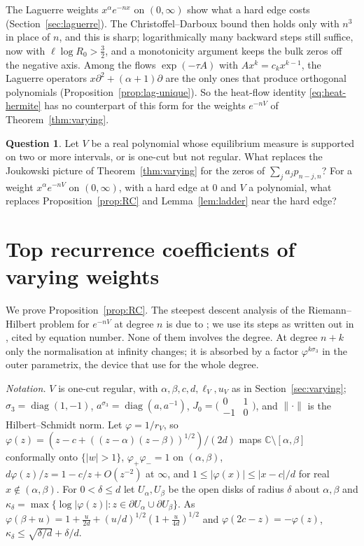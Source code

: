 \documentclass[11pt]{amsart}
\theoremstyle{definition}
\newtheorem{question}[theorem]{Question}
\theoremstyle{remark}
\numberwithin{equation}{section}
\newcommand{\C}{\mathbb{C}}
\begin{document}
The Laguerre weights $x^\alpha e^{-nx}$ on $(0,\infty)$ show what a hard edge costs (Section~\ref{sec:laguerre}). The Christoffel--Darboux bound then holds only with $n^3$ in place of $n$, and this is sharp; logarithmically many backward steps still suffice, now with $\ell\log R_0>\frac32$, and a monotonicity argument keeps the bulk zeros off the negative axis. Among the flows $\exp(-\tau A)$ with $Ax^k=c_kx^{k-1}$, the Laguerre operators $x\partial^2+(\alpha+1)\partial$ are the only ones that produce orthogonal polynomials (Proposition~\ref{prop:lag-unique}). So the heat-flow identity \eqref{eq:heat-hermite} has no counterpart of this form for the weights $e^{-nV}$ of Theorem~\ref{thm:varying}.

\begin{question}\label{q:varying}
Let $V$ be a real polynomial whose equilibrium measure is supported on two or more intervals, or is one-cut but not regular. What replaces the Joukowski picture of Theorem~\ref{thm:varying} for the zeros of $\sum_ja_jp_{n-j,n}$? For a weight $x^\alpha e^{-nV}$ on $(0,\infty)$, with a hard edge at $0$ and $V$ a polynomial, what replaces Proposition~\ref{prop:RC} and Lemma~\ref{lem:ladder} near the hard edge?
\end{question}

\appendix

\section{Top recurrence coefficients of varying weights}\label{app:rc}

We prove Proposition~\ref{prop:RC}. The steepest descent analysis of the Riemann--Hilbert problem for $e^{-nV}$ at degree $n$ is due to \cite{DKMVZ}; we use its steps as written out in \cite{Bl}, cited by equation number. None of them involves the degree. At degree $n+k$ only the normalisation at infinity changes; it is absorbed by a factor $\varphi^{k\sigma_3}$ in the outer parametrix, the device that \cite{KMVV} use for the whole degree.

\emph{Notation.} $V$ is one-cut regular, with $\alpha,\beta,c,d,\ell_V,u_V$ as in Section~\ref{sec:varying}; $\sigma_3=\operatorname{diag}(1,-1)$, $a^{\sigma_3}=\operatorname{diag}(a,a^{-1})$, $J_0=\bigl(\begin{smallmatrix}0&1\\-1&0\end{smallmatrix}\bigr)$, and $\|\cdot\|$ is the Hilbert--Schmidt norm. Let $\varphi=1/r_V$, so $\varphi(z)=(z-c+((z-\alpha)(z-\beta))^{1/2})/(2d)$ maps $\C\setminus[\alpha,\beta]$ conformally onto $\{|w|>1\}$, $\varphi_+\varphi_-=1$ on $(\alpha,\beta)$, $d\varphi(z)/z=1-c/z+O(z^{-2})$ at $\infty$, and $1\le|\varphi(x)|\le|x-c|/d$ for real $x\notin(\alpha,\beta)$. For $0<\delta\le d$ let $U_\alpha,U_\beta$ be the open disks of radius $\delta$ about $\alpha,\beta$ and $\kappa_\delta=\max\{\log|\varphi(z)|:z\in\partial U_\alpha\cup\partial U_\beta\}$. As $\varphi(\beta+u)=1+\frac u{2d}+(u/d)^{1/2}(1+\frac u{4d})^{1/2}$ and $\varphi(2c-z)=-\varphi(z)$, $\kappa_\delta\le\sqrt{\delta/d}+\delta/d$.
\end{document}
